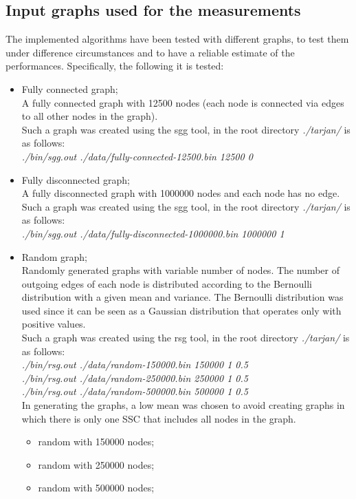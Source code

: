 \subsection{Input graphs used for the measurements}
The implemented algorithms have been tested with different graphs, to test them under difference circumstances and to have a reliable estimate of the performances.
Specifically, the following it is tested:
\begin{itemize}

    \item Fully connected graph;
      \\A fully connected graph with 12500 nodes (each node is connected via edges to all other nodes in the graph).
      \\Such a graph was created using the sgg tool, in the root directory \textit{./tarjan/} is as follows: 
      \\\textit{./bin/sgg.out ./data/fully-connected-12500.bin 12500 0}

    \item Fully disconnected graph;
    \\A fully disconnected graph with 1000000 nodes and each node has no edge.
    \\Such a graph was created using the sgg tool, in the root directory \textit{./tarjan/} is as follows: 
    \\\textit{./bin/sgg.out ./data/fully-disconnected-1000000.bin 1000000 1}

    \item Random graph;
    \\Randomly generated graphs with variable number of nodes. The number of outgoing edges of each node is distributed according to the Bernoulli distribution with a given mean and variance. The Bernoulli distribution was used since it can be seen as a Gaussian distribution that operates only with positive values. 
    \\Such a graph was created using the rsg tool, in the root directory \textit{./tarjan/} is as follows: 
    \\\textit{./bin/rsg.out ./data/random-150000.bin 150000 1 0.5}
    \\\textit{./bin/rsg.out ./data/random-250000.bin 250000 1 0.5}
    \\\textit{./bin/rsg.out ./data/random-500000.bin 500000 1 0.5}
    \\In generating the graphs, a low mean was chosen to avoid creating graphs in which there is only one SSC that includes all nodes in the graph.
    \begin{itemize}
      \item random with 150000 nodes;
      \item random with 250000 nodes;
      \item random with 500000 nodes;
    \end{itemize}
    

\end{itemize}
